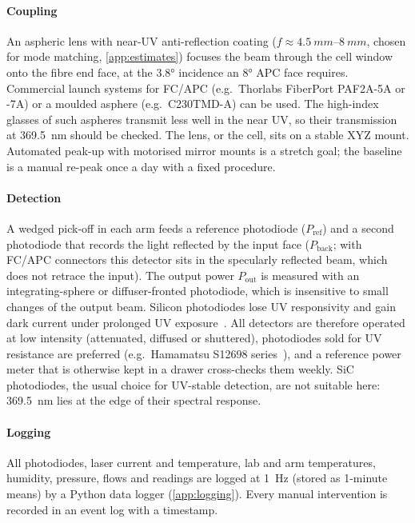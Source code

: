\paragraph{Coupling} An aspheric lens with near-UV anti-reflection coating ($f\approx\SIrange{4.5}{8}{mm}$,
chosen for mode matching, \cref{app:estimates}) focuses the beam through the cell window onto the
fibre end face, at the \ang{3.8} incidence an \ang{8} APC face requires. Commercial launch systems for
FC/APC (e.g.\ Thorlabs FiberPort PAF2A-5A or -7A) or a moulded asphere (e.g.\ C230TMD-A) can be used.
The high-index glasses of such aspheres transmit less well in the near UV, so their transmission at
\SI{369.5}{nm} should be checked. The lens, or the cell, sits on a stable XYZ mount. Automated peak-up with motorised mirror
mounts is a stretch goal; the baseline is a manual re-peak once a day with a fixed procedure.

\paragraph{Detection} A wedged pick-off in each arm feeds a reference photodiode ($P_\text{ref}$) and a
second photodiode that records the light reflected by the input face ($P_\text{back}$; with FC/APC
connectors this detector sits in the specularly reflected beam, which does not retrace the input). The output power $P_\text{out}$
is measured with an integrating-sphere or diffuser-fronted photodiode, which is insensitive to small
changes of the output beam. Silicon photodiodes lose UV responsivity and gain dark current under
prolonged UV exposure~\cite{HamamatsuS1336,Korde1987}. All detectors are therefore operated at low
intensity (attenuated, diffused or shuttered), photodiodes sold for UV resistance are preferred (e.g.\
Hamamatsu S12698 series~\cite{HamamatsuS12698}), and a reference power meter that is otherwise kept
in a drawer cross-checks them weekly. SiC photodiodes, the usual choice for UV-stable detection, are not
suitable here: \SI{369.5}{nm} lies at the edge of their spectral response.

\paragraph{Logging} All photodiodes, laser current and temperature, lab and arm temperatures, humidity,
pressure, flows and \Oxy{} readings are logged at \SI{1}{Hz} (stored as 1-minute means) by a Python
data logger (\cref{app:logging}). Every manual intervention is recorded in an event log with a
timestamp.

